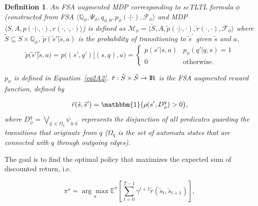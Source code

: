 \documentclass{article}
\newtheorem{definition}{Definition}
\begin{document}
\begin{definition}\label{def3}
 An FSA augmented MDP corresponding to scTLTL formula $\phi$ (constructed from FSA $\langle \mathbb{Q}_\phi, \Psi_\phi, q_{\phi,0}, p_\phi(\cdot | \cdot), \mathcal{F}_\phi \rangle$ and MDP $\langle S,A,p(\cdot|\cdot,\cdot),r(\cdot,\cdot, \cdot)\rangle$) is defined as $\mathcal{M} _\phi= \langle \tilde{S}, A, \tilde{p}(\cdot|\cdot,\cdot),\tilde{r}(\cdot, \cdot),  \mathcal{F}_\phi \rangle$ where $\tilde{S} \subseteq S \times \mathbb{Q}_{\phi}$, $\tilde{p}(\tilde{s}'|\tilde{s},a)$ is the probability of transitioning to $\tilde{s}^\prime$ given $\tilde{s}$ and $a$,
 \begin{equation}\label{eq3A2}
 \tilde{p}(\tilde{s}'|\tilde{s},a) = p\big((s', q')|(s,q), a\big)
 = \begin{cases}
 p(s'|s,a) & p_\phi(q'|q,s) =1 \\
 0 & \text{otherwise}.
 \end{cases}
 \end{equation}


\noindent $p_\phi$ is defined in Equation~\eqref{eq2A2}. $\tilde{r}: \tilde{S} \times \tilde{S} \to {\rm I\!R}$ is the FSA augmented reward function, defined by 


\begin{equation}\label{eq3A3}
\tilde{r}(\tilde{s},\tilde{s}') =\mathbbm{1}\big( \rho(s',D_{\phi}^{q})>0\big), 
\end{equation}
\noindent where $D_{\phi}^{q}=\bigvee_{q^\prime \in\Omega_{q}} \psi_{q, q^\prime}$ represents the disjunction of all predicates guarding the transitions that originate from $q$ ($\Omega_{q}$ is the set of automata states that are connected with $q$ through outgoing edges). 
\end{definition}

The goal is to find the optimal policy that maximizes the expected sum of discounted return, i.e.

\begin{equation}\label{eq3A4}
 \pi^\star = \underset{\pi}{\arg\max} \mathbb{E}^{\pi}\left[\sum_{t=0}^{T-1} \gamma^{t+1}\tilde{r}(\tilde{s}_t,\tilde{s}_{t+1})\right], 
\end{equation}
\end{document}
